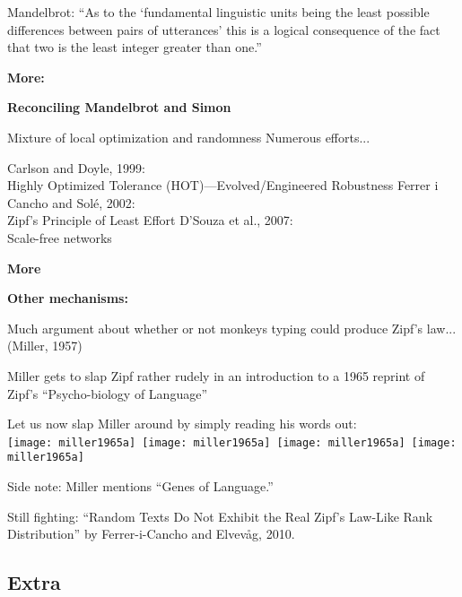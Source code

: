       Mandelbrot: ``As to the `fundamental linguistic units being the least possible
      differences between pairs of utterances' this is a logical consequence
      of the fact that two is the least integer greater than one.''
    
  


  \textbf{More:}

  \textbf{Reconciling Mandelbrot and Simon}
      
       Mixture of local optimization and randomness 
       Numerous efforts...
      
      
       Carlson and Doyle, 1999:\\
        Highly Optimized Tolerance (HOT)---Evolved/Engineered Robustness\cite{carlson1999a,carlson2002a}
       Ferrer i Cancho and Sol\'{e}, 2002: \\
        Zipf's Principle of Least Effort\cite{ferrericancho2002a}
       D'Souza et al., 2007:\\ Scale-free networks\cite{dsouza2007a}
      
  


  \textbf{More}

  \textbf{Other mechanisms:}
    
     
      Much argument about whether or not monkeys typing
      could produce Zipf's law... (Miller, 1957)\cite{miller1957a}
     
      Miller gets to slap Zipf rather rudely in an introduction to
      a 1965 reprint of Zipf's ``Psycho-biology of Language''\cite{miller1965a,zipf1935a}
     
      Let us now slap Miller around by simply reading his words out:\\
      \texttt{[image: miller1965a]}\,
      \texttt{[image: miller1965a]}\,
      \texttt{[image: miller1965a]}\,
      \texttt{[image: miller1965a]}

     
      Side note: Miller mentions ``Genes of Language.''
     
      Still fighting: ``Random Texts Do Not Exhibit the Real Zipf's 
      Law-Like Rank Distribution''\cite{ferrericancho2010a}
      by Ferrer-i-Cancho and Elvev\r{a}g, 2010.
    
  



\subsection{Extra}

